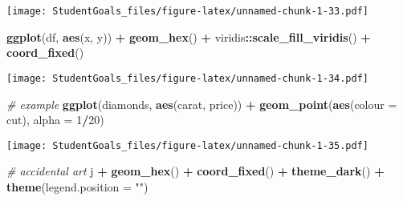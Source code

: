 \documentclass[]{article}
\newenvironment{Shaded}{\begin{snugshade}}{\end{snugshade}}
\newcommand{\CommentTok}[1]{\textcolor[rgb]{0.56,0.35,0.01}{\textit{#1}}}
\newcommand{\DataTypeTok}[1]{\textcolor[rgb]{0.13,0.29,0.53}{#1}}
\newcommand{\DecValTok}[1]{\textcolor[rgb]{0.00,0.00,0.81}{#1}}
\newcommand{\KeywordTok}[1]{\textcolor[rgb]{0.13,0.29,0.53}{\textbf{#1}}}
\newcommand{\NormalTok}[1]{#1}
\newcommand{\OperatorTok}[1]{\textcolor[rgb]{0.81,0.36,0.00}{\textbf{#1}}}
\newcommand{\StringTok}[1]{\textcolor[rgb]{0.31,0.60,0.02}{#1}}
\begin{document}
\begin{Shaded}
\end{Shaded}

\texttt{[image: StudentGoals\_files/figure-latex/unnamed-chunk-1-33.pdf]}

\begin{Shaded}
\begin{Highlighting}[]
\KeywordTok{ggplot}\NormalTok{(df, }\KeywordTok{aes}\NormalTok{(x, y)) }\OperatorTok{+}
\StringTok{  }\KeywordTok{geom_hex}\NormalTok{() }\OperatorTok{+}
\StringTok{  }\NormalTok{viridis}\OperatorTok{::}\KeywordTok{scale_fill_viridis}\NormalTok{() }\OperatorTok{+}
\StringTok{  }\KeywordTok{coord_fixed}\NormalTok{()}
\end{Highlighting}
\end{Shaded}

\texttt{[image: StudentGoals\_files/figure-latex/unnamed-chunk-1-34.pdf]}

\begin{Shaded}
\begin{Highlighting}[]
\CommentTok{# example}
\KeywordTok{ggplot}\NormalTok{(diamonds, }\KeywordTok{aes}\NormalTok{(carat, price)) }\OperatorTok{+}
\StringTok{  }\KeywordTok{geom_point}\NormalTok{(}\KeywordTok{aes}\NormalTok{(}\DataTypeTok{colour =}\NormalTok{ cut), }\DataTypeTok{alpha =} \DecValTok{1}\OperatorTok{/}\DecValTok{20}\NormalTok{)}
\end{Highlighting}
\end{Shaded}

\texttt{[image: StudentGoals\_files/figure-latex/unnamed-chunk-1-35.pdf]}

\begin{Shaded}
\begin{Highlighting}[]
\CommentTok{# accidental art}
\NormalTok{j }\OperatorTok{+}\StringTok{ }\KeywordTok{geom_hex}\NormalTok{() }\OperatorTok{+}
\StringTok{  }\KeywordTok{coord_fixed}\NormalTok{() }\OperatorTok{+}\StringTok{ }\KeywordTok{theme_dark}\NormalTok{() }\OperatorTok{+}\StringTok{ }\KeywordTok{theme}\NormalTok{(}\DataTypeTok{legend.position =} \StringTok{""}\NormalTok{)}
\end{Highlighting}
\end{Shaded}
\end{document}
